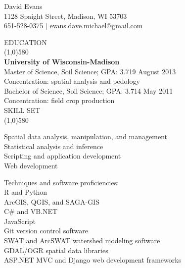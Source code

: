 \documentclass{article}
\begin{document}
\begin{centering}   
\Huge{David Evans} \\
\large{  1128 Spaight Street, Madison, WI 53703 \\
651-528-0375 $|$ evans.dave.michael@gmail.com} \\ 
\bigskip

\onehalfspacing
\end{centering}
\noindent \large{EDUCATION}\\
\line(1,0){580}\\ \normalsize
\textbf{University of Wisconsin-Madison}\\
Master of Science, Soil Science; GPA: 3.719 \hfill August 2013\\
\indent Concentration: spatial analysis and pedology\\
\noindent Bachelor of Science, Soil Science; GPA: 3.714 \hfill May 2011\\
\indent Concentration: field crop production\\

\noindent \large{SKILL SET}\\ 
\line(1,0){580}\\
\parbox[t][3cm][t]{0.4\textwidth}{
	\textbullet Spatial data analysis, manipulation, and management\\
	\textbullet Statistical analysis and inference\\
	\textbullet Scripting and application development\\
	\textbullet Web development\\
} 
\parbox[t][2.5cm][t]{0.07\textwidth}{\hfil}
\parbox[t][3.2cm][t]{0.45\textwidth}{
	Techniques and software proficiencies:\\
	\small{
		\textbullet R and Python \\%
		\textbullet ArcGIS, QGIS, and SAGA-GIS\\
		\textbullet C\# and VB.NET\\
		\textbullet JavaScript\\
		\textbullet Git version control software\\ %
		\textbullet SWAT and ArcSWAT watershed modeling software\\
				\textbullet GDAL/OGR spatial data libraries\\
		\textbullet ASP.NET MVC and Django web development frameworks\\
	}
}
\end{document}
